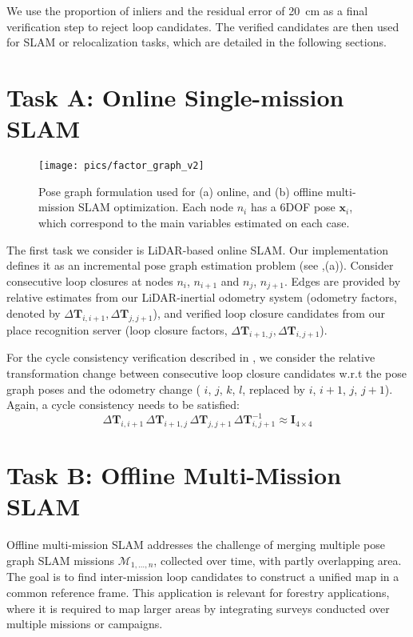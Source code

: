 We use the proportion of inliers and the residual error of \SI{20}{\centi\meter} as a final verification step to reject loop candidates. The verified candidates are then used for SLAM or relocalization tasks, which are detailed in the following sections.

\section{Task A: Online Single-mission SLAM} 
\label{sec:online_slam_mode}
\begin{figure}[t]
  \centering
  \texttt{[image: pics/factor\_graph\_v2]}
  \caption{Pose graph formulation used for (a) online, and (b) offline multi-mission SLAM optimization. Each node $n_{i}$ has a 6DOF pose $\mathbf{x}_{i}$, which correspond to the main variables estimated on each case.}
  \label{fig:factor_graph}
\end{figure}

The first task we consider is LiDAR-based online SLAM. Our implementation defines it as an incremental pose graph estimation problem (see ,(a)). Consider consecutive loop closures at nodes $n_{i}$, $n_{i+1}$ and $n_{j}$, $n_{j+1}$. Edges are provided by relative estimates from our LiDAR-inertial odometry system (odometry factors, denoted by $\Delta\mathbf{T}_{i,i+1}, \Delta\mathbf{T}_{j, j+1}$), and verified loop closure candidates from our place recognition server (loop closure factors, $\Delta\mathbf{T}_{i+1, j}, \Delta\mathbf{T}_{i, j+1}$).

For the cycle consistency verification described in , we consider the relative transformation change between consecutive loop closure candidates w.r.t the pose graph poses and the odometry change (  $i$, $j$, $k$, $l$, replaced by ${i}$, ${i+1}$, ${j}$, ${j+1}$). Again, a cycle consistency needs to be satisfied:
\begin{equation}
  \label{eq:cycle-online}
  \Delta\mathbf{T}_{i,i+1}\, \Delta\mathbf{T}_{i+1, j}\, \Delta\mathbf{T}_{j, j+1}\, \Delta\mathbf{T}_{i, j+1}^{-1} \approx \mathbf{I}_{4\times4}
\end{equation}
\section{Task B: Offline Multi-Mission SLAM}\label{sec:offline}
Offline multi-mission SLAM addresses the challenge of merging multiple pose graph SLAM missions ${\mathcal{M}_{1, \ldots, n}}$, collected over time, with partly overlapping area. 
The goal is to find inter-mission loop candidates to construct a unified map in a common reference frame. This application is relevant for forestry applications, where it is required to map larger areas by integrating surveys conducted over multiple missions or campaigns.


